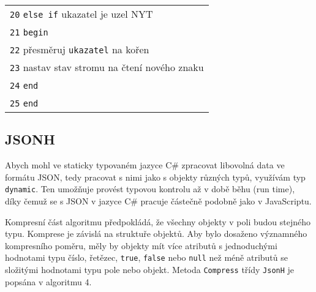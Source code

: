 \begin{table}[!h]
\begin{tabular}{|l|}
\texttt{20} \hspace*{5mm}\texttt{else if} ukazatel je uzel NYT\\
\texttt{21} \hspace*{5mm}\texttt{begin}\\
\texttt{22} \hspace*{10mm}přesměruj \texttt{ukazatel} na kořen\\
\texttt{23} \hspace*{10mm}nastav stav stromu na čtení nového znaku\\
\texttt{24} \hspace*{5mm}\texttt{end}\\
\texttt{25} \texttt{end}\\
\hline
\end{tabular}
\end{table}

\subsection{JSONH}
Abych mohl ve staticky typovaném jazyce C\# zpracovat libovolná data ve formátu JSON, tedy pracovat s nimi jako s objekty různých typů, využívám typ \texttt{dynamic}. Ten umožňuje provést typovou kontrolu až v době běhu (run time), díky čemuž se s JSON v jazyce C\# pracuje částečně podobně jako v JavaScriptu. %

Kompresní část algoritmu předpokládá, že všechny objekty v poli budou stejného typu. Komprese je závislá na struktuře objektů. Aby bylo dosaženo významného kompresního poměru, měly by objekty mít více atributů s jednoduchými hodnotami typu číslo, řetězec, \texttt{true}, \texttt{false} nebo \texttt{null} než méně atributů se složitými hodnotami typu pole nebo objekt. Metoda \texttt{Compress} třídy \texttt{JsonH} je popsána v algoritmu 4.

